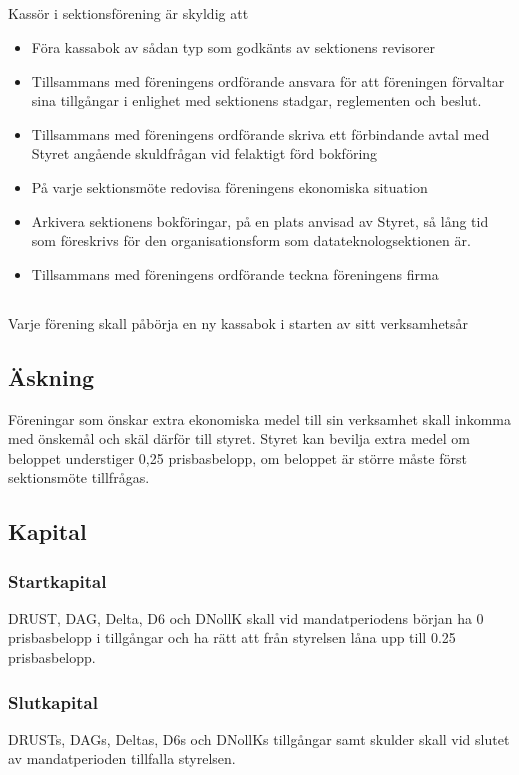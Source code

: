 \documentclass[a4paper, 10pt]{article}
\begin{document}
\subsection{}
Kassör i sektionsförening är skyldig att
\begin{itemize}
\item Föra kassabok av sådan typ som godkänts av sektionens revisorer
\item Tillsammans med föreningens ordförande ansvara för att föreningen förvaltar sina tillgångar i enlighet med sektionens stadgar, reglementen och beslut.
\item Tillsammans med föreningens ordförande skriva ett förbindande avtal med Styret angående skuldfrågan vid felaktigt förd bokföring
\item På varje sektionsmöte redovisa föreningens ekonomiska situation
\item Arkivera sektionens bokföringar, på en plats anvisad av Styret, så lång tid som föreskrivs för den organisationsform som datateknologsektionen är.
\item Tillsammans med föreningens ordförande teckna föreningens firma
\end{itemize}
\subsection{}
Varje förening skall påbörja en ny kassabok i starten av sitt verksamhetsår
\subsection{Äskning}
Föreningar som önskar extra ekonomiska medel till sin verksamhet skall inkomma med önskemål och skäl därför till styret. Styret kan bevilja extra medel om beloppet understiger 0,25 prisbasbelopp, om beloppet är större måste först sektionsmöte tillfrågas.
\subsection{Kapital}
\label{sec:sektionsforeningar_startkapital}
\subsubsection{Startkapital}
DRUST, DAG, Delta, D6 och DNollK skall vid mandatperiodens början ha 0 prisbasbelopp i tillgångar och ha rätt att från styrelsen låna upp till 0.25 prisbasbelopp.
\subsubsection{Slutkapital}
DRUSTs, DAGs, Deltas, D6s och DNollKs tillgångar samt skulder skall vid slutet av mandatperioden tillfalla styrelsen.
\end{document}

